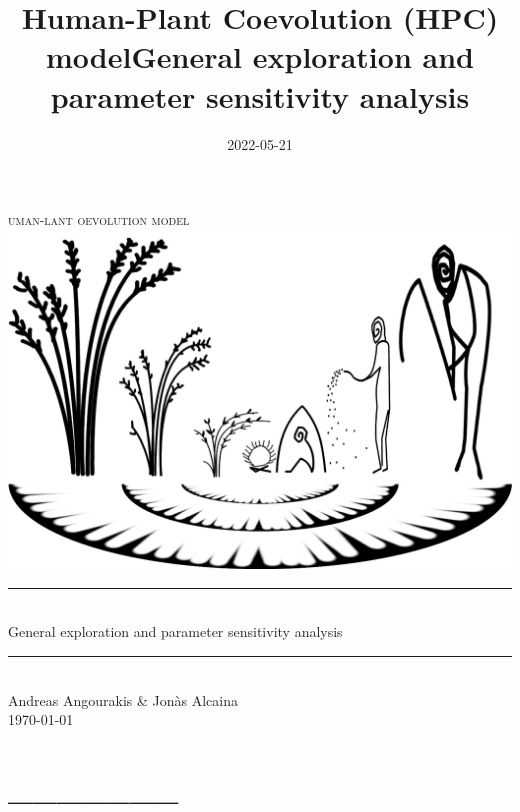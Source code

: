 \documentclass[
]{book}
\title{Human-Plant Coevolution (HPC) modelGeneral exploration and parameter sensitivity analysis}
\author{}
\date{\vspace{-2.5em}2022-05-21}
\begin{document}
\maketitle

\newcommand{\HRule}{\rule{\linewidth}{0.5mm}}


\begin{center}

\textsc{\LARGE
{}uman-lant oevolution model} 
\\[1cm]
\includegraphics[width=\textwidth]{images/hpcModel-logo_v2.png}
\\[1.5cm]
\HRule \\[0.4cm]
{ \huge General exploration and parameter sensitivity analysis \\[0.15cm] }
\HRule \\[1.5cm]
Andreas Angourakis \& Jon\`{a}s Alcaina
\\[1cm]
\today \\ [1cm]

\end{center}

\newpage
{}

{
\hypersetup{linkcolor=}
\setcounter{tocdepth}{1}
\tableofcontents
}
\hypertarget{section}{%
\chapter*{\_\_\_\_\_\_\_}\label{section}}
\end{document}
